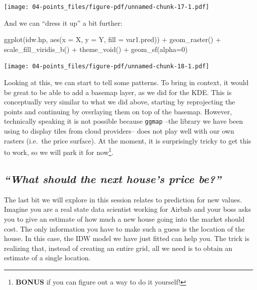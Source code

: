 \documentclass[
  letterpaper,
  DIV=11,
  numbers=noendperiod,
  oneside]{scrreprt}
\newenvironment{Shaded}{\begin{snugshade}}{\end{snugshade}}
\newcommand{\AttributeTok}[1]{\textcolor[rgb]{0.40,0.45,0.13}{#1}}
\newcommand{\DecValTok}[1]{\textcolor[rgb]{0.68,0.00,0.00}{#1}}
\newcommand{\FunctionTok}[1]{\textcolor[rgb]{0.28,0.35,0.67}{#1}}
\newcommand{\NormalTok}[1]{\textcolor[rgb]{0.00,0.23,0.31}{#1}}
\newcommand{\SpecialCharTok}[1]{\textcolor[rgb]{0.37,0.37,0.37}{#1}}
\begin{document}
\texttt{[image: 04-points\_files/figure-pdf/unnamed-chunk-17-1.pdf]}

And we can ``dress it up'' a bit further:

\begin{Shaded}
\begin{Highlighting}[]
\FunctionTok{ggplot}\NormalTok{(idw.hp, }\FunctionTok{aes}\NormalTok{(}\AttributeTok{x =}\NormalTok{ X, }\AttributeTok{y =}\NormalTok{ Y, }\AttributeTok{fill =}\NormalTok{ var1.pred)) }\SpecialCharTok{+}
  \FunctionTok{geom\_raster}\NormalTok{() }\SpecialCharTok{+}
  \FunctionTok{scale\_fill\_viridis\_b}\NormalTok{() }\SpecialCharTok{+}
  \FunctionTok{theme\_void}\NormalTok{() }\SpecialCharTok{+}
  \FunctionTok{geom\_sf}\NormalTok{(}\AttributeTok{alpha=}\DecValTok{0}\NormalTok{)}
\end{Highlighting}
\end{Shaded}

\texttt{[image: 04-points\_files/figure-pdf/unnamed-chunk-18-1.pdf]}

Looking at this, we can start to tell some patterns. To bring in
context, it would be great to be able to add a basemap layer, as we did
for the KDE. This is conceptually very similar to what we did above,
starting by reprojecting the points and continuing by overlaying them on
top of the basemap. However, technically speaking it is not possible
because \texttt{ggmap} --the library we have been using to display tiles
from cloud providers-- does not play well with our own rasters (i.e.~the
price surface). At the moment, it is surprisingly tricky to get this to
work, so we will park it for now\footnote{\textbf{BONUS} if you can
  figure out a way to do it yourself!}.

\subsection{\texorpdfstring{\emph{``What should the next house's price
be?''}}{``What should the next house's price be?''}}\label{what-should-the-next-houses-price-be}

The last bit we will explore in this session relates to prediction for
new values. Imagine you are a real state data scientist working for
Airbnb and your boss asks you to give an estimate of how much a new
house going into the market should cost. The only information you have
to make such a guess is the location of the house. In this case, the IDW
model we have just fitted can help you. The trick is realizing that,
instead of creating an entire grid, all we need is to obtain an estimate
of a single location.
\end{document}
